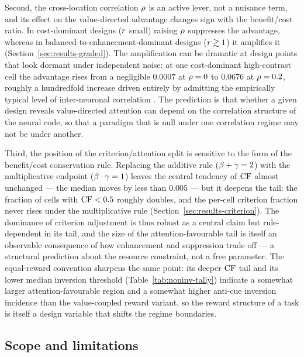 Second, the cross-location correlation $\rho$ is an active lever, not a
nuisance term, and its effect on the value-directed advantage changes
sign with the benefit/cost ratio. In cost-dominant designs ($r$
small) raising $\rho$ suppresses the advantage, whereas in
balanced-to-enhancement-dominant designs ($r \gtrsim 1$) it
amplifies it (Section~\ref{sec:results-graded}). The amplification can be
dramatic at design points that look dormant under independent noise: at
one cost-dominant high-contrast cell the advantage rises from a
negligible $0.0007$ at $\rho = 0$ to $0.0676$ at $\rho = 0.2$, roughly
a hundredfold increase driven entirely by admitting the empirically
typical level of inter-neuronal correlation
\cite{CohenMaunsell2009, RuffCohen2016, Srinath2021}. The prediction is
that whether a given design reveals value-directed attention can depend
on the correlation structure of the neural code, so that a paradigm that
is null under one correlation regime may not be under another.

Third, the position of the criterion/attention split is sensitive to the
form of the benefit/cost conservation rule. Replacing the additive rule
($\beta + \gamma = 2$) with the multiplicative endpoint
($\beta \cdot \gamma = 1$) leaves the central tendency of $\mathrm{CF}$ almost
unchanged --- the median moves by less than $0.005$ --- but it deepens
the tail: the fraction of cells with $\mathrm{CF} < 0.5$ roughly doubles, and the
per-cell criterion fraction never rises under the multiplicative rule
(Section~\ref{sec:results-criterion}). The dominance of criterion
adjustment is thus robust as a central claim but rule-dependent in its
tail, and the size of the attention-favourable tail is itself an
observable consequence of how enhancement and suppression trade off ---
a structural prediction about the resource constraint, not a free
parameter. The equal-reward convention sharpens the same point: its
deeper $\mathrm{CF}$ tail and its lower median inversion threshold
(Table~\ref{tab:noninv-tally}) indicate a somewhat larger
attention-favourable region and a somewhat higher anti-cue inversion
incidence than the value-coupled reward variant, so the reward
structure of a task is itself a design variable that shifts the regime
boundaries.

\subsection*{Scope and limitations}

